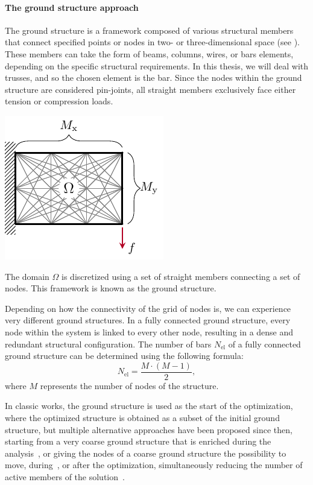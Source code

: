 \paragraph{The ground structure approach}
The ground structure is a framework composed of various structural members that connect specified points or nodes in two- or three-dimensional space (see ). These members can take the form of beams, columns, wires, or bars elements, depending on the specific structural requirements. In this thesis, we will deal with trusses, and so the chosen element is the bar. Since the nodes within the ground structure are considered pin-joints, all straight members exclusively face either tension or compression loads. 
\begin{marginfigure}
    \centering
    \includegraphics{figures/02_literature/04_disc_mesh/d_mesh.pdf}
    \caption{The domain $\Omega$ is discretized using a set of straight members connecting a set of nodes. This framework is known as the ground structure.}
    \label{fig:02_mesh_d}
\end{marginfigure}

Depending on how the connectivity of the grid of nodes is, we can experience very different ground structures. In a fully connected ground structure, every node within the system is linked to every other node, resulting in a dense and redundant structural configuration. The number of bars $N_{\text{el}}$ of a fully connected ground structure can be determined using the following formula:
\begin{equation}
    N_{\text{el}} = \frac{M \cdot (M-1)}{2},
\end{equation}
where $M$ represents the number of nodes of the structure.

In classic works, the ground structure is used as the start of the optimization, where the optimized structure is obtained as a subset of the initial ground structure, but multiple alternative approaches have been proposed since then, \eg starting from a very coarse ground structure that is enriched during the analysis~, or giving the nodes of a coarse ground structure the possibility to move, during~, or after the optimization, simultaneously reducing the number of active members of the solution~.

